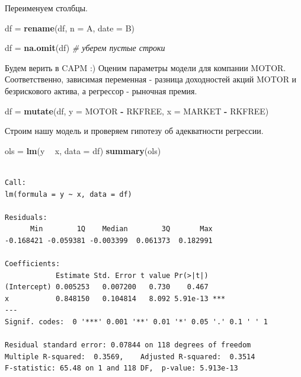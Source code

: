 \documentclass[]{book}
\newenvironment{Shaded}{\begin{snugshade}}{\end{snugshade}}
\newcommand{\CommentTok}[1]{\textcolor[rgb]{0.56,0.35,0.01}{\textit{#1}}}
\newcommand{\DataTypeTok}[1]{\textcolor[rgb]{0.13,0.29,0.53}{#1}}
\newcommand{\KeywordTok}[1]{\textcolor[rgb]{0.13,0.29,0.53}{\textbf{#1}}}
\newcommand{\NormalTok}[1]{#1}
\newcommand{\OperatorTok}[1]{\textcolor[rgb]{0.81,0.36,0.00}{\textbf{#1}}}
\newcommand{\StringTok}[1]{\textcolor[rgb]{0.31,0.60,0.02}{#1}}
\begin{document}
Переименуем столбцы.

\begin{Shaded}
\begin{Highlighting}[]
\NormalTok{df =}\StringTok{ }\KeywordTok{rename}\NormalTok{(df, }\DataTypeTok{n =}\NormalTok{ A, }\DataTypeTok{date =}\NormalTok{ B) }
\end{Highlighting}
\end{Shaded}

\begin{Shaded}
\begin{Highlighting}[]
\NormalTok{df =}\StringTok{ }\KeywordTok{na.omit}\NormalTok{(df) }\CommentTok{# уберем пустые строки}
\end{Highlighting}
\end{Shaded}

Будем верить в CAPM :) Оценим параметры модели для компании MOTOR. Соответственно, зависимая переменная - разница доходностей акций MOTOR и безрискового актива, а регрессор - рыночная премия.

\begin{Shaded}
\begin{Highlighting}[]
\NormalTok{df =}\StringTok{ }\KeywordTok{mutate}\NormalTok{(df, }\DataTypeTok{y =}\NormalTok{ MOTOR }\OperatorTok{-}\StringTok{ }\NormalTok{RKFREE, }\DataTypeTok{x =}\NormalTok{ MARKET }\OperatorTok{-}\StringTok{ }\NormalTok{RKFREE) }
\end{Highlighting}
\end{Shaded}

Строим нашу модель и проверяем гипотезу об адекватности регрессии.

\begin{Shaded}
\begin{Highlighting}[]
\NormalTok{ols =}\StringTok{ }\KeywordTok{lm}\NormalTok{(y }\OperatorTok{~}\StringTok{ }\NormalTok{x, }\DataTypeTok{data =}\NormalTok{ df)}
\KeywordTok{summary}\NormalTok{(ols)}
\end{Highlighting}
\end{Shaded}

\begin{verbatim}

Call:
lm(formula = y ~ x, data = df)

Residuals:
      Min        1Q    Median        3Q       Max 
-0.168421 -0.059381 -0.003399  0.061373  0.182991 

Coefficients:
            Estimate Std. Error t value Pr(>|t|)    
(Intercept) 0.005253   0.007200   0.730    0.467    
x           0.848150   0.104814   8.092 5.91e-13 ***
---
Signif. codes:  0 '***' 0.001 '**' 0.01 '*' 0.05 '.' 0.1 ' ' 1

Residual standard error: 0.07844 on 118 degrees of freedom
Multiple R-squared:  0.3569,    Adjusted R-squared:  0.3514 
F-statistic: 65.48 on 1 and 118 DF,  p-value: 5.913e-13
\end{verbatim}
\end{document}

